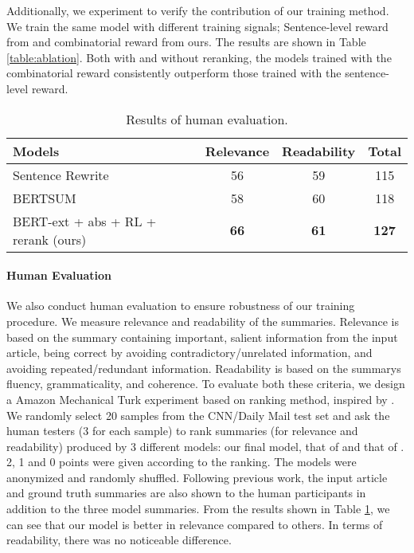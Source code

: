 \documentclass[11pt,a4paper]{article}
\begin{document}
Additionally, we experiment to verify the contribution of our training method.
We train the same model with different training signals;
Sentence-level reward from \citet{chen-bansal-2018-fast} and combinatorial 
reward from ours. The results are shown in Table \ref{table:ablation}.
Both with and without reranking, the models trained with the combinatorial reward
consistently outperform those trained with the sentence-level reward.

\begin{table}
\begin{center}
\begin{adjustbox}{max width=\columnwidth}
\begin{tabular}{l|cc|c}
    \hline 
    \bf Models & \bf Relevance & \bf Readability & \bf Total \\ 
    \hline
    Sentence Rewrite \cite{chen-bansal-2018-fast} & 56 & 59 & 115 \\
    BERTSUM \cite{liu2019fine} & 58 & 60 & 118 \\
    BERT-ext + abs + RL + rerank (ours) & \bf 66 & \bf 61 & \bf 127 \\
    \hline
\end{tabular}
\end{adjustbox}
\end{center}
\caption{\label{table:human} Results of human evaluation.}
\end{table}

\paragraph{Human Evaluation}
We also conduct human evaluation to ensure robustness of our training procedure. We measure
relevance and readability of the summaries. Relevance is based on the summary containing important, salient information from the input article,
being correct by avoiding contradictory/unrelated
information, and avoiding repeated/redundant information. Readability is based on the summarys fluency, grammaticality, and coherence. To
evaluate both these criteria, we design a Amazon Mechanical Turk experiment based on ranking method, inspired by \citet{kiritchenko-mohammad-2017-best}.
We randomly select 20 samples from the CNN/Daily Mail test set and
ask the human testers (3 for each sample) to rank summaries (for relevance and readability) produced by 3 different models:
our final model, that of \citet{chen-bansal-2018-fast} and  that of \citet{liu2019fine}.
2, 1 and 0 points were given according to the ranking.
The models were anonymized and randomly shuffled.
Following previous work,
the input article and ground truth summaries are
also shown to the human participants in addition
to the three model summaries.
From the results shown in Table \ref{table:human}, we can see that our model is
better in relevance compared to others. In terms of readability, there was no
noticeable difference.
\end{document}
